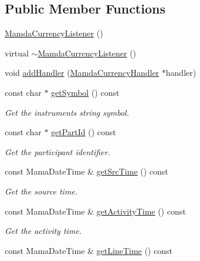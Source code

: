 \subsection*{Public Member Functions}
\begin{CompactItemize}
\item 
\hyperlink{classWombat_1_1MamdaCurrencyListener_331d5b71016ebdcdd47de7ff9ded97d2}{Mamda\-Currency\-Listener} ()
\item 
virtual \hyperlink{classWombat_1_1MamdaCurrencyListener_250629c22714ba9d7ac3f52cef462f86}{$\sim$Mamda\-Currency\-Listener} ()
\item 
void \hyperlink{classWombat_1_1MamdaCurrencyListener_120979ebd57b91ead52d29e344b224d1}{add\-Handler} (\hyperlink{classWombat_1_1MamdaCurrencyHandler}{Mamda\-Currency\-Handler} $\ast$handler)
\item 
const char $\ast$ \hyperlink{classWombat_1_1MamdaCurrencyListener_6c9b1053a22182c09cdfd9ac020d71b9}{get\-Symbol} () const 
\begin{CompactList}\small\item\em Get the instruments string symbol. \item\end{CompactList}\item 
const char $\ast$ \hyperlink{classWombat_1_1MamdaCurrencyListener_2a5ec025f8c088274a68563ebe51f063}{get\-Part\-Id} () const 
\begin{CompactList}\small\item\em Get the participant identifier. \item\end{CompactList}\item 
const Mama\-Date\-Time \& \hyperlink{classWombat_1_1MamdaCurrencyListener_04fcdfcdc9376b9a0daf71773e28b58e}{get\-Src\-Time} () const 
\begin{CompactList}\small\item\em Get the source time. \item\end{CompactList}\item 
const Mama\-Date\-Time \& \hyperlink{classWombat_1_1MamdaCurrencyListener_3d35c47919af62b2900d2c560b66d898}{get\-Activity\-Time} () const 
\begin{CompactList}\small\item\em Get the activity time. \item\end{CompactList}\item 
const Mama\-Date\-Time \& \hyperlink{classWombat_1_1MamdaCurrencyListener_1f9fa224749c87c92668bf55bcb2cfa5}{get\-Line\-Time} () const 

\end{CompactItemize}
